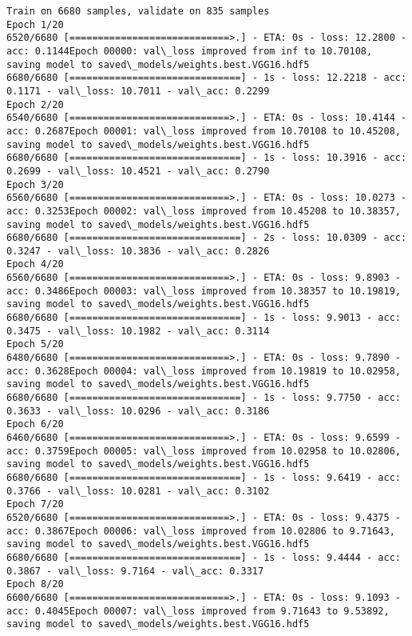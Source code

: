 \documentclass[11pt]{article}
\begin{document}
    \begin{Verbatim}[commandchars=\\\{\}]
Train on 6680 samples, validate on 835 samples
Epoch 1/20
6520/6680 [============================>.] - ETA: 0s - loss: 12.2800 - acc: 0.1144Epoch 00000: val\_loss improved from inf to 10.70108, saving model to saved\_models/weights.best.VGG16.hdf5
6680/6680 [==============================] - 1s - loss: 12.2218 - acc: 0.1171 - val\_loss: 10.7011 - val\_acc: 0.2299
Epoch 2/20
6540/6680 [============================>.] - ETA: 0s - loss: 10.4144 - acc: 0.2687Epoch 00001: val\_loss improved from 10.70108 to 10.45208, saving model to saved\_models/weights.best.VGG16.hdf5
6680/6680 [==============================] - 1s - loss: 10.3916 - acc: 0.2699 - val\_loss: 10.4521 - val\_acc: 0.2790
Epoch 3/20
6560/6680 [============================>.] - ETA: 0s - loss: 10.0273 - acc: 0.3253Epoch 00002: val\_loss improved from 10.45208 to 10.38357, saving model to saved\_models/weights.best.VGG16.hdf5
6680/6680 [==============================] - 2s - loss: 10.0309 - acc: 0.3247 - val\_loss: 10.3836 - val\_acc: 0.2826
Epoch 4/20
6560/6680 [============================>.] - ETA: 0s - loss: 9.8903 - acc: 0.3486Epoch 00003: val\_loss improved from 10.38357 to 10.19819, saving model to saved\_models/weights.best.VGG16.hdf5
6680/6680 [==============================] - 1s - loss: 9.9013 - acc: 0.3475 - val\_loss: 10.1982 - val\_acc: 0.3114
Epoch 5/20
6480/6680 [============================>.] - ETA: 0s - loss: 9.7890 - acc: 0.3628Epoch 00004: val\_loss improved from 10.19819 to 10.02958, saving model to saved\_models/weights.best.VGG16.hdf5
6680/6680 [==============================] - 1s - loss: 9.7750 - acc: 0.3633 - val\_loss: 10.0296 - val\_acc: 0.3186
Epoch 6/20
6460/6680 [============================>.] - ETA: 0s - loss: 9.6599 - acc: 0.3759Epoch 00005: val\_loss improved from 10.02958 to 10.02806, saving model to saved\_models/weights.best.VGG16.hdf5
6680/6680 [==============================] - 1s - loss: 9.6419 - acc: 0.3766 - val\_loss: 10.0281 - val\_acc: 0.3102
Epoch 7/20
6520/6680 [============================>.] - ETA: 0s - loss: 9.4375 - acc: 0.3867Epoch 00006: val\_loss improved from 10.02806 to 9.71643, saving model to saved\_models/weights.best.VGG16.hdf5
6680/6680 [==============================] - 1s - loss: 9.4444 - acc: 0.3867 - val\_loss: 9.7164 - val\_acc: 0.3317
Epoch 8/20
6600/6680 [============================>.] - ETA: 0s - loss: 9.1093 - acc: 0.4045Epoch 00007: val\_loss improved from 9.71643 to 9.53892, saving model to saved\_models/weights.best.VGG16.hdf5

\end{Verbatim}
\end{document}
